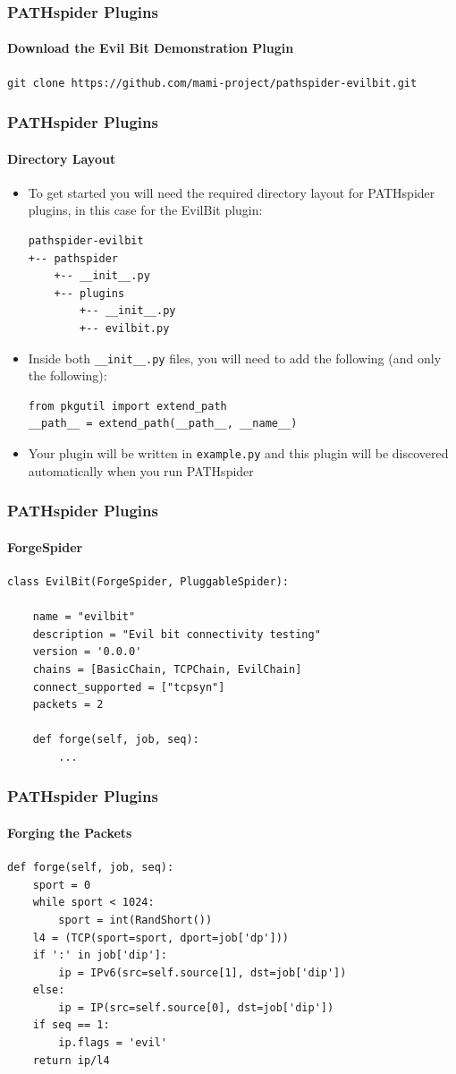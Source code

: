 \documentclass[handout,notes]{beamer}
\begin{document}
\begin{frame}[fragile]
\frametitle{PATHspider Plugins}
\framesubtitle{Download the Evil Bit Demonstration Plugin}
\begin{lstlisting}[caption={Download the Evil Bit Demonstration Plugin}]
git clone https://github.com/mami-project/pathspider-evilbit.git
\end{lstlisting}
\end{frame}

\begin{frame}[fragile]
\frametitle{PATHspider Plugins}
\framesubtitle{Directory Layout}
\begin{itemize}
\item{To get started you will need the required directory layout for PATHspider
plugins, in this case for the EvilBit plugin:}
{\footnotesize\begin{verbatim}
pathspider-evilbit
+-- pathspider
    +-- __init__.py
    +-- plugins
        +-- __init__.py
        +-- evilbit.py
\end{verbatim}}
\item{Inside both \texttt{\_\_init\_\_.py} files, you will need to add the
following (and only the following):
\begin{lstlisting}
from pkgutil import extend_path
__path__ = extend_path(__path__, __name__)
\end{lstlisting}}
\item{Your plugin will be written in \texttt{example.py} and this plugin will be
discovered automatically when you run PATHspider}
\end{itemize}
\end{frame}

\begin{frame}[fragile]
\frametitle{PATHspider Plugins}
\framesubtitle{ForgeSpider}
\begin{lstlisting}[caption={Outline for Evil Bit plugin using ForgeSpider}]
class EvilBit(ForgeSpider, PluggableSpider):

    name = "evilbit"
    description = "Evil bit connectivity testing"
    version = '0.0.0'
    chains = [BasicChain, TCPChain, EvilChain]
    connect_supported = ["tcpsyn"]
    packets = 2

    def forge(self, job, seq):
        ...
\end{lstlisting}
\end{frame}

\begin{frame}[fragile]
\frametitle{PATHspider Plugins}
\framesubtitle{Forging the Packets}
\begin{lstlisting}[caption={Creating Packets With and Without the Evil Bit}]
def forge(self, job, seq):
    sport = 0
    while sport < 1024:
        sport = int(RandShort())
    l4 = (TCP(sport=sport, dport=job['dp']))
    if ':' in job['dip']:
        ip = IPv6(src=self.source[1], dst=job['dip'])
    else:
        ip = IP(src=self.source[0], dst=job['dip'])
    if seq == 1:
        ip.flags = 'evil'
    return ip/l4
\end{lstlisting}
\end{frame}
\end{document}
